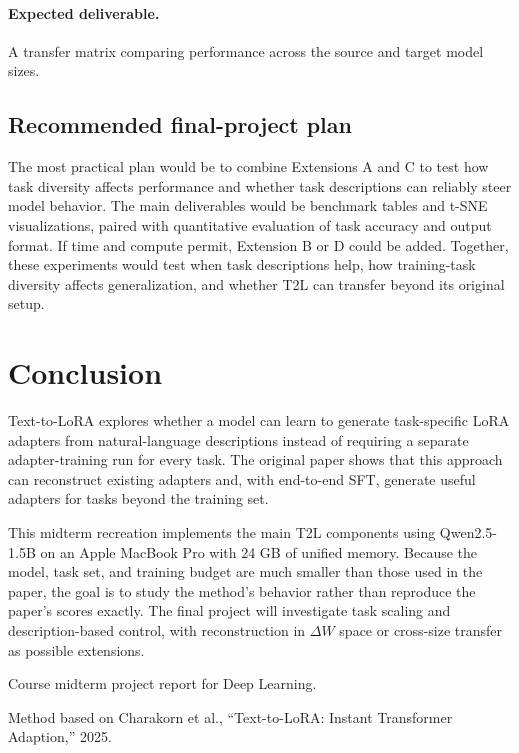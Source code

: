 \documentclass{article}
\begin{document}
\paragraph{Expected deliverable.}
A transfer matrix comparing performance across the source and target model sizes.

\subsection{Recommended final-project plan}

The most practical plan would be to combine Extensions A and C to test how task diversity affects performance and whether task descriptions can reliably steer model behavior. The main deliverables would be benchmark tables and t-SNE visualizations, paired with quantitative evaluation of task accuracy and output format. If time and compute permit, Extension B or D could be added. Together, these experiments would test when task descriptions help, how training-task diversity affects generalization, and whether T2L can transfer beyond its original setup.

\section{Conclusion}

Text-to-LoRA explores whether a model can learn to generate task-specific LoRA adapters from natural-language descriptions instead of requiring a separate adapter-training run for every task. The original paper shows that this approach can reconstruct existing adapters and, with end-to-end SFT, generate useful adapters for tasks beyond the training set.

This midterm recreation implements the main T2L components using Qwen2.5-1.5B on an Apple MacBook Pro with 24 GB of unified memory. Because the model, task set, and training budget are much smaller than those used in the paper, the goal is to study the method's behavior rather than reproduce the paper's scores exactly. The final project will investigate task scaling and description-based control, with reconstruction in $\Delta W$ space or cross-size transfer as possible extensions.

\begin{ack}
Course midterm project report for Deep Learning.

Method based on Charakorn et al., ``Text-to-LoRA: Instant Transformer Adaption,'' 2025.
\end{ack}
\end{document}
